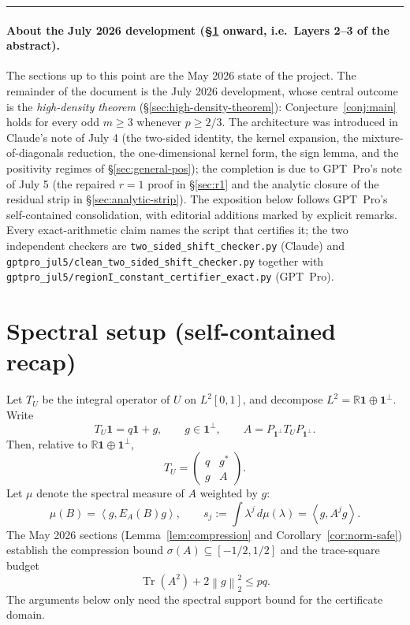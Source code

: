\documentclass[11pt]{article}
\newcommand{\one}{\mathbf 1}
\newcommand{\ip}[2]{\left\langle #1,#2\right\rangle}
\newcommand{\Tr}{\operatorname{Tr}}
\newcommand{\norm}[1]{\left\|#1\right\|}
\begin{document}

\bigskip
\begin{center}\rule{0.6\linewidth}{0.4pt}\end{center}
\paragraph{About the July 2026 development (\S\ref{sec:setup2} onward, i.e.\ Layers 2--3 of the abstract).}
The sections up to this point are the May 2026 state of the project.  The
remainder of the document is the July 2026 development, whose central outcome is the
\emph{high-density theorem} (\S\ref{sec:high-density-theorem}): Conjecture~\ref{conj:main} holds for every odd
$m\ge3$ whenever $p\ge2/3$.  The architecture was introduced in Claude's note
of July 4 (the two-sided identity, the kernel expansion, the
mixture-of-diagonals reduction, the one-dimensional kernel form, the sign
lemma, and the positivity regimes of \S\ref{sec:general-pos}); the completion
is due to GPT~Pro's note of July 5 (the repaired $r=1$ proof in \S\ref{sec:r1}
and the analytic closure of the residual strip in \S\ref{sec:analytic-strip}).
The exposition below follows GPT~Pro's self-contained consolidation, with
editorial additions marked by explicit remarks.  Every exact-arithmetic claim
names the script that certifies it; the two independent checkers are
\texttt{two\_sided\_shift\_checker.py} (Claude) and
\texttt{gptpro\_jul5/clean\_two\_sided\_shift\_checker.py} together with
\texttt{gptpro\_jul5/regionI\_constant\_certifier\_exact.py} (GPT~Pro).

\section{Spectral setup (self-contained recap)}\label{sec:setup2}

Let $T_U$ be the integral operator of $U$ on $L^2[0,1]$, and decompose $L^2=\mathbb R\one\oplus\one^\perp$.  Write
\[
        T_U\one=q\one+g,
        \qquad g\in\one^\perp,
        \qquad A=P_{\one^\perp}T_UP_{\one^\perp}.
\]
Then, relative to $\mathbb R\one\oplus\one^\perp$,
\[
        T_U=\begin{pmatrix}q&g^*\\ g&A\end{pmatrix}.
\]
Let $\mu$ denote the spectral measure of $A$ weighted by $g$:
\[
        \mu(B)=\ip{g}{E_A(B)g},
        \qquad
        s_j:=\int \lambda^j\,d\mu(\lambda)=\ip{g}{A^jg}.
\]
The May 2026 sections (Lemma~\ref{lem:compression} and Corollary~\ref{cor:norm-safe}) establish the compression bound $\sigma(A)\subseteq[-1/2,1/2]$ and the trace-square budget
\[
        \Tr(A^2)+2\norm g_2^2\le pq.
\]
The arguments below only need the spectral support bound for the certificate domain.
\end{document}
